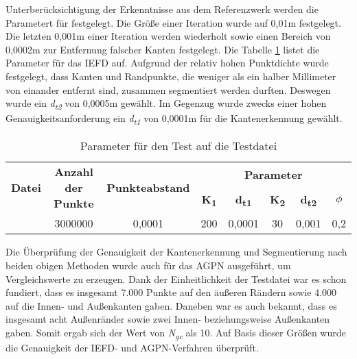 Unterberücksichtigung der Erkenntnisse aus dem Referenzwerk werden die Parametert für \testcloud festgelegt. Die Größe einer Iteration wurde auf 0,01m festgelegt. Die letzten 0,001m einer Iteration werden wiederholt sowie einen Bereich von 0,0002m zur Entfernung falscher Kanten festgelegt. Die Tabelle \ref{table: parameters_test1} listet die Parameter für das IEFD auf. Aufgrund der relativ hohen Punktdichte wurde festgelegt, dass Kanten und Randpunkte, die weniger als ein halber Millimeter von einander entfernt sind, zusammen segmentiert werden durften. Deswegen wurde ein \textit{d\textsubscript{t2}} von 0,0005m gewählt. Im Gegenzug wurde zwecks einer hohen Genauigkeitsanforderung ein \textit{d\textsubscript{t1}} von 0,0001m für die Kantenerkennung gewählt.

\begin{table}
	\centering
	\begin{tabular}[width=\textwidth]{l *{7}{c}}
		\hline
		\multirow{2}{*}{\textbf{Datei}}&\multirow{2}{*}{\textbf{Anzahl der Punkte}}&\multirow{2}{*}{\textbf{Punkteabstand}}&\multicolumn{5}{c}{\textbf{Parameter}}\\
		& & & \textbf{K\textsubscript{1}} & \textbf{d\textsubscript{t1}} & \textbf{K\textsubscript{2}} & \textbf{d\textsubscript{t2}} & \textbf{$\phi$} \\
		\hline
		\testcloud & 3000000 & 0,0001 & 200 & 0,0001 & 30 & 0,001 & 0,2 \\
		\hline
	\end{tabular}
	\caption{Parameter für den Test auf die Testdatei}
	\label{table: parameters_test1}
\end{table}

Die Überprüfung der Genauigkeit der Kantenerkennung und Segmentierung nach beiden obigen Methoden wurde auch für das AGPN ausgeführt, um Vergleichswerte zu erzeugen. Dank der Einheitlichkeit der Testdatei war es schon fundiert, dass es insgesamt 7.000 Punkte auf den äußeren Rändern sowie 4.000 auf die Innen- und Außenkanten gaben. Daneben war es auch bekannt, dass es insgesamt acht Außenränder sowie zwei Innen- beziehungsweise Außenkanten gaben. Somit ergab sich der Wert von \textit{N\textsubscript{gc}} als 10. Auf Basis dieser Größen wurde die Genauigkeit der IEFD- und AGPN-Verfahren überprüft.

